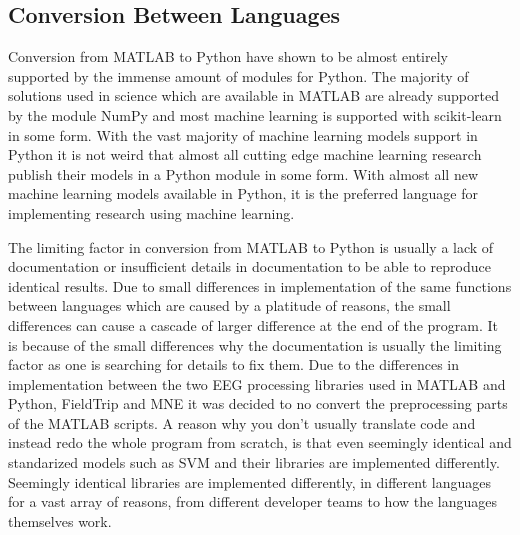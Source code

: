 \documentclass[12pt, a4paper]{article}
\begin{document}



\subsection{Conversion Between Languages}

Conversion from MATLAB to Python have shown to be almost entirely supported by the immense amount of modules for Python.
The majority of solutions used in science which are available in MATLAB are already supported by the module NumPy and most machine learning is supported with scikit-learn in some form.
With the vast majority of machine learning models support in Python it is not weird that almost all cutting edge machine learning research publish their models in a Python module in some form.
With almost all new machine learning models available in Python, it is the preferred language for implementing research using machine learning.

The limiting factor in conversion from MATLAB to Python is usually a lack of documentation or insufficient details in documentation to be able to reproduce identical results.
Due to small differences in implementation of the same functions between languages which are caused by a platitude of reasons, the small differences can cause a cascade of larger difference at the end of the program.
It is because of the small differences why the documentation is usually the limiting factor as one is searching for details to fix them.
Due to the differences in implementation between the two EEG processing libraries used in MATLAB and Python, FieldTrip and MNE it was decided to no convert the preprocessing parts of the MATLAB scripts.
A reason why you don't usually translate code and instead redo the whole program from scratch, is that even seemingly identical and standarized models such as SVM and their libraries are implemented differently.
Seemingly identical libraries are implemented differently, in different languages for a vast array of reasons, from different developer teams to how the languages themselves work.
\end{document}
